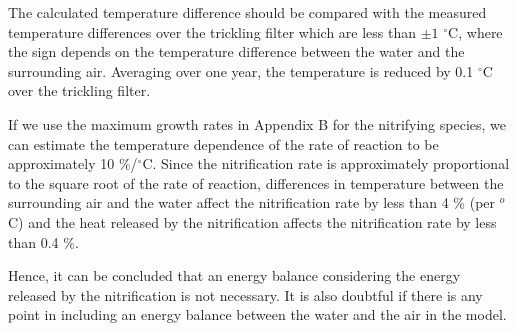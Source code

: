 The calculated temperature difference should be compared with the measured temperature differences over the trickling filter which are less than  $\pm 1$ $^\circ$C, where the sign depends on the temperature difference between the water and the surrounding air. Averaging over one year, the temperature is reduced by 0.1 $^\circ$C over the trickling filter. 

If we use the maximum growth rates in Appendix B for the nitrifying species, we can estimate the temperature dependence of the rate of reaction to be approximately 10 \%/$^\circ$C. Since the nitrification rate is approximately proportional to the square root of the rate of reaction, differences in temperature between the surrounding air and the water affect the nitrification rate by less than 4 \% (per $^o$C) and the heat released by the nitrification affects the nitrification rate by less than 0.4 \%.  

Hence, it can be concluded that an energy balance considering the energy released by the nitrification is not necessary. It is also doubtful if there is any point in including an energy balance between the water and the air in the model.


